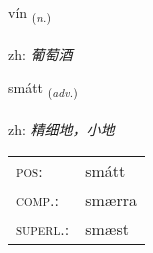 \documentclass[frontgrid, backgrid]{flacards}\usepackage[]{graphicx}\usepackage[]{color}
\begin{document}
\renewcommand{\flhead}{\vskip5pt \fboxsep=0pt {\small\bfseries\footnotesize Nafnorð | 名词}}
\renewcommand{\fcfoot}{\vskip5pt \fboxsep=0pt \hspace{2pt}{\small\bfseries\footnotesize 2K}}

\renewcommand{\blhead}{\vskip5pt {\small\bfseries\footnotesize Nafnorð | 名词 }}
\renewcommand{\bcfoot}{\vskip5pt \hspace{2pt}{\small\bfseries\footnotesize 2K}}


{vín \small{\textsubscript{(\textit{n.})}} \\[1ex] %
\textphonetic{[viːn]} \\
zh: \emph{葡萄酒} \\  [2ex]
\renewcommand*{\arraystretch}{0.8}
}

\renewcommand{\flhead}{\vskip5pt \fboxsep=0pt {\small\bfseries\footnotesize Atviksorð | 副词}}
\renewcommand{\fcfoot}{\vskip5pt \fboxsep=0pt \hspace{2pt}{\small\bfseries\footnotesize 2K}}

\renewcommand{\blhead}{\vskip5pt {\small\bfseries\footnotesize Atviksorð | 副词 }}
\renewcommand{\bcfoot}{\vskip5pt \hspace{2pt}{\small\bfseries\footnotesize 2K}}


{smátt \small{\textsubscript{(\textit{adv.})}} \\[1ex] %
\textphonetic{[smauht]} \\
zh: \emph{精细地，小地} \\  [2ex]
\renewcommand*{\arraystretch}{0.8}
\begin{tabular}{ll}
\textsc{pos}: & smátt \\ 
\textsc{comp.}: & smærra \\ 
\textsc{superl.}: & smæst \\
\end{tabular}
}
\end{document}
